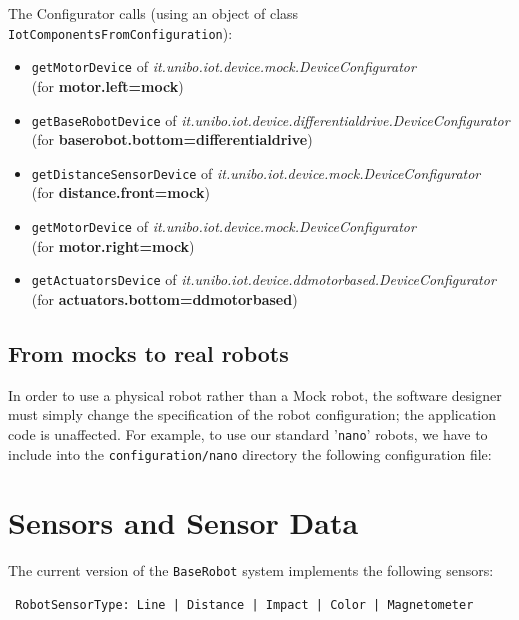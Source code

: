 The Configurator calls (using an object of class \texttt{IotComponentsFromConfiguration}):
\begin{itemize}
\item \texttt{getMotorDevice} of \textit{it.unibo.iot.device.mock.DeviceConfigurator} \\ (for \textbf{motor.left=mock})
\item \texttt{getBaseRobotDevice} of \textit{it.unibo.iot.device.differentialdrive.DeviceConfigurator} \\(for \textbf{baserobot.bottom=differentialdrive})
\item \texttt{getDistanceSensorDevice} of \textit{it.unibo.iot.device.mock.DeviceConfigurator} \\(for \textbf{distance.front=mock})
\item \texttt{getMotorDevice} of \textit{it.unibo.iot.device.mock.DeviceConfigurator} \\(for \textbf{motor.right=mock})
\item \texttt{getActuatorsDevice} of \textit{it.unibo.iot.device.ddmotorbased.DeviceConfigurator} \\(for \textbf{actuators.bottom=ddmotorbased})
\end{itemize}


\subsection{From mocks to real robots}

In order to use a physical robot rather than a Mock robot, the software designer must simply change the specification of the robot configuration; the application code is unaffected. For example, to use our standard '\texttt{nano}' robots, we have to include into the \texttt{configuration/nano} directory the following configuration file:



\newpage 
\section{Sensors and Sensor Data}
 
The current version of the \texttt{BaseRobot} system implements the following sensors:
\begin{verbatim}
 RobotSensorType: Line | Distance | Impact | Color | Magnetometer  
\end{verbatim} 

